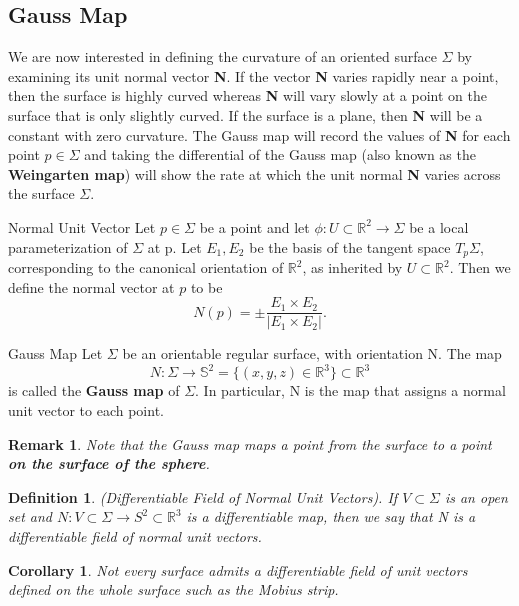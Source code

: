 \documentclass[twoside]{article}
\newtheorem{corollary}[theorem]{Corollary}
\newtheorem{definition}[theorem]{Definition}
\newtheorem{remark}[theorem]{Remark}
\begin{document}
\subsection{Gauss Map}
We are now interested in defining the curvature of an oriented surface $\Sigma$ by examining its unit normal vector \textbf{N}. If the vector \textbf{N} varies rapidly near a point, then the surface is highly curved whereas \textbf{N} will vary slowly at a point on the surface that is only slightly curved. If the surface is a plane, then \textbf{N} will be a constant with zero curvature. The Gauss map will record the values of \textbf{N} for each point $p \in \Sigma$ and taking the differential of the Gauss map (also known as the \textbf{Weingarten map}) will show the rate at which the unit normal \textbf{N} varies across the surface $\Sigma.$


\begin{definition_exam}{Normal Unit Vector}{} Let $p \in \Sigma$ be a point and let $\phi: U \subset \mathbb{R}^2 \rightarrow \Sigma$ be a local parameterization of $\Sigma$ at p. Let $E_1, E_2$ be the basis of the tangent space $T_p\Sigma$, corresponding to the canonical orientation of $\mathbb{R}^2$, as inherited by $U \subset \mathbb{R}^2$. Then we define the normal vector at $p$ to be 
$$
N(p) = \pm \frac{E_1 \times E_2}{|E_1 \times E_2|}.
$$
\end{definition_exam}

\begin{definition_exam}{Gauss Map}{} Let $\Sigma$ be an orientable regular surface, with orientation N. The map 
$$
N: \Sigma \rightarrow \mathbb{S}^2 = \{(x,y,z) \in \mathbb{R}^3\} \subset \mathbb{R}^3
$$
is called the \textbf{Gauss map} of $\Sigma$. In particular, N is the map that assigns a normal unit vector to each point.
\end{definition_exam}

\begin{remark}Note that the Gauss map maps a point from the surface to a point \textbf{on the surface of the sphere}.
\end{remark}

\begin{definition}(Differentiable Field of Normal Unit Vectors). If $V \subset \Sigma$ is an open set and $N: V \subset \Sigma \rightarrow S^2 \subset \mathbb{R}^3$ is a differentiable map, then we say that N is a differentiable field of normal unit vectors.
\end{definition}

\begin{corollary}Not every surface admits a differentiable field of unit vectors defined on the whole surface such as the Mobius strip.
\end{corollary}
\end{document}

